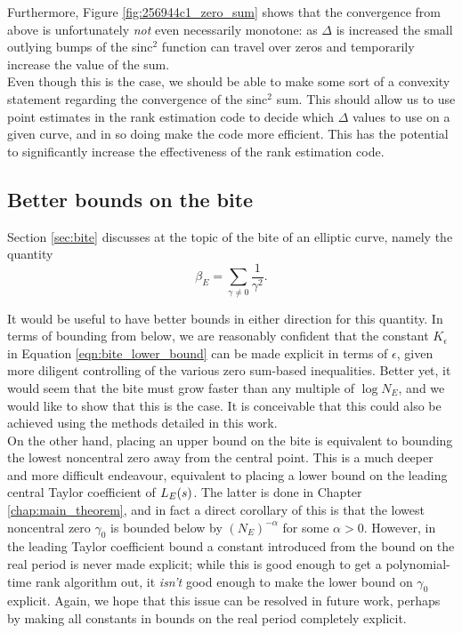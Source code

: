 Furthermore, Figure \ref{fig:256944c1_zero_sum} shows that the convergence from above is unfortunately {\it not} even necessarily monotone: as $\Delta$ is increased the small outlying bumps of the sinc$^2$ function can travel over zeros and temporarily increase the value of the sum. \\

Even though this is the case, we should be able to make some sort of a convexity statement regarding the convergence of the sinc$^2$ sum. This should allow us to use point estimates in the rank estimation code to decide which $\Delta$ values to use on a given curve, and in so doing make the code more efficient. This has the potential to significantly increase the effectiveness of the rank estimation code.

\subsection{Better bounds on the bite}

Section \ref{sec:bite} discusses at the topic of the bite of an elliptic curve, namely the quantity
\begin{equation}
\beta_E = \sum_{\gamma \ne 0} \frac{1}{\gamma^2}.
\end{equation}

It would be useful to have better bounds in either direction for this quantity. In terms of bounding from below, we are reasonably confident that the constant $K_{\epsilon}$ in Equation \ref{eqn:bite_lower_bound} can be made explicit in terms of $\epsilon$, given more diligent controlling of the various zero sum-based inequalities. Better yet, it would seem that the bite must grow faster than any multiple of $\log N_E$, and we would like to show that this is the case. It is conceivable that this could also be achieved using the methods detailed in this work. \\

On the other hand, placing an upper bound on the bite is equivalent to bounding the lowest noncentral zero away from the central point. This is a much deeper and more difficult endeavour, equivalent to placing a lower bound on the leading central Taylor coefficient of $L_E(s)$. The latter is done in Chapter \ref{chap:main_theorem}, and in fact a direct corollary of this is that the lowest noncentral zero $\gamma_0$ is bounded below by $(N_E)^{-\alpha}$ for some $\alpha>0$. However, in the leading Taylor coefficient bound a constant introduced from the bound on the real period is never made explicit; while this is good enough to get a polynomial-time rank algorithm out, it {\it isn't} good enough to make the lower bound on $\gamma_0$ explicit. Again, we hope that this issue can be resolved in future work, perhaps by making all constants in bounds on the real period completely explicit.



